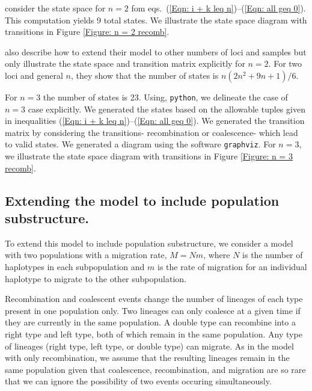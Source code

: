 \documentclass[11pt,oneside]{amsart}
\begin{document}
\cite{SimonsenChurchill1997} consider the state space for $n = 2$ fom eqs.~(\ref{Eqn: i + k leq n})--(\ref{Eqn: all geq 0}). This computation yields 9 total states. We illustrate the state space diagram with transitions in Figure \ref{Figure: n = 2 recomb}.


 \cite{SimonsenChurchill1997} also describe how to extend their model to other numbers of loci and samples but only illustrate the state space and transition matrix explicitly for $n = 2$. For two loci and general $n$, they show that the number of states is $n(2n^2+9n+1)/6$. 

For $n = 3$ the number of states is 23. Using, \texttt{python}, we delineate the case of $n =3$ case explicitly. We generated the states based on the allowable tuples given in inequalities (\ref{Eqn: i + k leq n})--(\ref{Eqn: all geq 0}). We generated the transition matrix by considering the transitions- recombination or coalescence- which lead to valid states. We generated a diagram using the software \texttt{graphviz}. For $n=3$, we illustrate the state space diagram with transitions in Figure \ref{Figure: n = 3 recomb}. 

	
\subsection{Extending the model to include population substructure.}
\label{Subsection: recomb and mig}

To extend this model to include population substructure, we consider a model with two populations with a migration rate, $M = Nm$, where $N$ is the number of haplotypes in each subpopulation and $m$ is the rate of migration for an individual haplotype to migrate to the other subpopulation. 

Recombination and coalescent events change the number of lineages of each type present in one population only. Two lineages can only coalesce at a given time if they are currently in the same population. A double type can recombine into a right type and left type, both of which remain in the same population. Any type of lineages (right type, left type, or double type) can migrate. As in the model with only recombination, we assume that the resulting lineages remain in the same population given that coalescence, recombination, and migration are so rare that we can ignore the possibility of two events occuring simultaneously.
\end{document}
